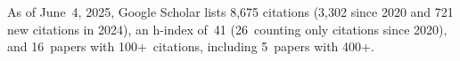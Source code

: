 %
As of June~4, 2025, Google Scholar lists
8,675 citations (3,302 since 2020 and 721 new citations in 2024),
an h-index of~41 (26~counting only citations since 2020),
and 16~papers with 100+~citations, including 5~papers with 400+.
